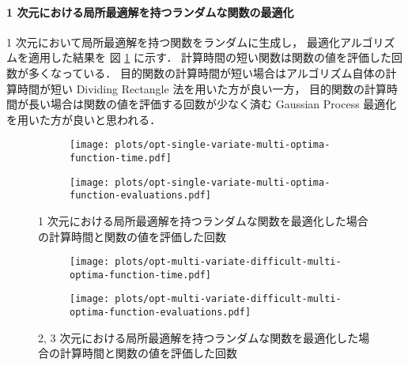 \paragraph{1 次元における局所最適解を持つランダムな関数の最適化}
1 次元において局所最適解を持つ関数をランダムに生成し，
最適化アルゴリズムを適用した結果を
図 \ref{fig:optimization_unconstrained-convex-optimization_single-variate-multi-optima-function} に示す．
計算時間の短い関数は関数の値を評価した回数が多くなっている．
目的関数の計算時間が短い場合はアルゴリズム自体の計算時間が短い
Dividing Rectangle 法を用いた方が良い一方，
目的関数の計算時間が長い場合は関数の値を評価する回数が少なく済む
Gaussian Process 最適化を用いた方が良いと思われる．

\begin{figure}[tp]
    \centering
    \begin{subfigure}{0.85\linewidth}
        \centering
        \texttt{[image: plots/opt-single-variate-multi-optima-function-time.pdf]}
    \end{subfigure}
    \begin{subfigure}{0.85\linewidth}
        \centering
        \texttt{[image: plots/opt-single-variate-multi-optima-function-evaluations.pdf]}
    \end{subfigure}
    \caption{1 次元における局所最適解を持つランダムな関数を最適化した場合の計算時間と関数の値を評価した回数}
    \label{fig:optimization_unconstrained-convex-optimization_single-variate-multi-optima-function}
\end{figure}

\begin{figure}[tp]
    \centering
    \begin{subfigure}{0.85\linewidth}
        \centering
        \texttt{[image: plots/opt-multi-variate-difficult-multi-optima-function-time.pdf]}
    \end{subfigure}
    \begin{subfigure}{0.85\linewidth}
        \centering
        \texttt{[image: plots/opt-multi-variate-difficult-multi-optima-function-evaluations.pdf]}
    \end{subfigure}
    \caption{2, 3 次元における局所最適解を持つランダムな関数を最適化した場合の計算時間と関数の値を評価した回数}
    \label{fig:optimization_unconstrained-convex-optimization_multi-variate-difficult-multi-optima-function}
\end{figure}

